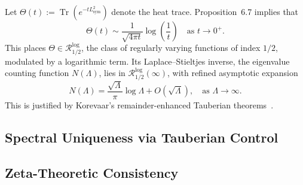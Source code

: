 


\begin{remark}
Let \( \Theta(t) := \operatorname{Tr}(e^{-tL^2_{\mathrm{sym}}}) \) denote the heat trace. Proposition~6.7 implies that
\[
\Theta(t) \sim \frac{1}{\sqrt{4\pi t}}\log\left(\frac{1}{t}\right)
\quad \text{as } t \to 0^+.
\]
This places \( \Theta \in \mathcal{R}_{1/2}^{\log} \), the class of regularly varying functions of index \( 1/2 \), modulated by a logarithmic term. Its Laplace–Stieltjes inverse, the eigenvalue counting function \( N(\Lambda) \), lies in \( \mathcal{R}_{1/2}^{\log}(\infty) \), with refined asymptotic expansion
\[
N(\Lambda) = \frac{\sqrt{\Lambda}}{\pi}\log \Lambda + O(\sqrt{\Lambda}),
\quad \text{as } \Lambda \to \infty.
\]
This is justified by Korevaar's remainder-enhanced Tauberian theorems~\cite[Ch.~III, §5]{Korevaar2004Tauberian}.
\end{remark}

\subsection{Spectral Uniqueness via Tauberian Control}




\subsection{Zeta-Theoretic Consistency}






